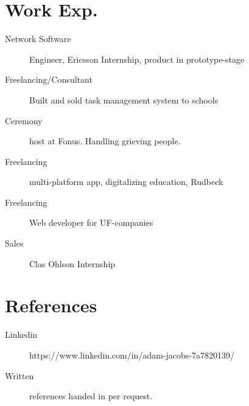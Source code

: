 \documentclass[margin,line,a4paper]{resume}
\begin{document}
\begin{resume}
\section{\mysidestyle Work Exp.}\vspace{1mm}
\begin{description}
    \item[Network Software] Engineer, Ericsson Internship, product in prototype-stage
    \item[Freelancing/Consultant] Built and sold task management system to schools
    \item[Ceremony] host at Fonus. Handling grieving people.
    \item[Freelancing] multi-platform app, digitalizing education, Rudbeck 
    \item[Freelancing] Web developer for UF-companies
    \item[Sales] Clas Ohlson Internship
\end{description}

\section{\mysidestyle References}
\begin{description}
    \item[Linkedin] https://www.linkedin.com/in/adam-jacobs-7a7820139/
    \item[Written] references handed in per request.
\end{description}

\end{resume}
\end{document}

